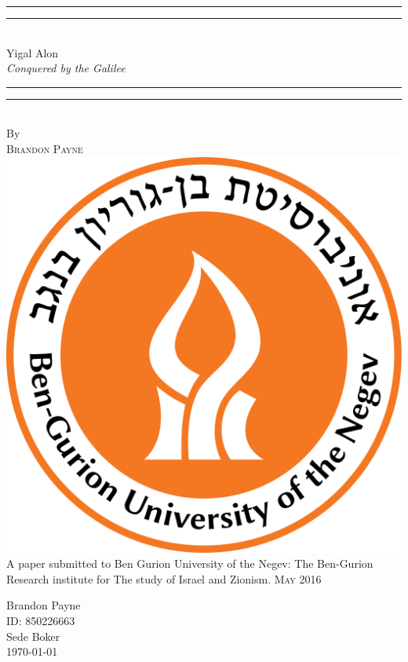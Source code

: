 %
\author{Brandon Payne}
%
\vspace*{13mm}
\begin{center}
\rule[0.5ex]{\linewidth}{2pt}\vspace*{-\baselineskip}\vspace*{3.2pt}
\rule[0.5ex]{\linewidth}{1pt}\\[\baselineskip]
{\Huge Yigal Alon}\\[4mm]
{\Large \textit{Conquered by the Galilee}}\\
\rule[0.5ex]{\linewidth}{1pt}\vspace*{-\baselineskip}\vspace{3.2pt}
\rule[0.5ex]{\linewidth}{2pt}\\
\vspace{6.5mm}
{\large By}\\
\vspace{6.5mm}
{\large\textsc{Brandon Payne}}\\
\vspace{11mm}
\includegraphics[scale=0.2]{bgu_logo}\\
\vspace{11mm}
A paper submitted to Ben Gurion University of the Negev: The Ben-Gurion Research institute for The study of Israel and Zionism.
\vspace{9mm}
{\large\textsc{May 2016}}
\vspace{12mm}
\end{center}
\begin{flushright}
{\Large Brandon Payne}\\
ID: 850226663\\
Sede Boker\\
{\large \today}
\end{flushright}
